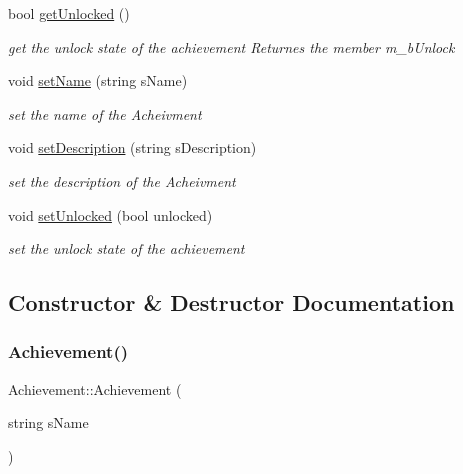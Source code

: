 \begin{DoxyCompactItemize}
\hypertarget{class_achievement_a1f0bb77d394b03c28b636688d7cbbf2b}{}\label{class_achievement_a1f0bb77d394b03c28b636688d7cbbf2b} 
bool \hyperlink{class_achievement_a1f0bb77d394b03c28b636688d7cbbf2b}{get\+Unlocked} ()
\begin{DoxyCompactList}\small\item\em get the unlock state of the achievement Returnes the member m\+\_\+b\+Unlock \end{DoxyCompactList}\item 
void \hyperlink{class_achievement_a9e0c9c6c154411d3529bca657c579beb}{set\+Name} (string s\+Name)
\begin{DoxyCompactList}\small\item\em set the name of the Acheivment \end{DoxyCompactList}\item 
void \hyperlink{class_achievement_a1e43852ad31739236d393f856e1f8f12}{set\+Description} (string s\+Description)
\begin{DoxyCompactList}\small\item\em set the description of the Acheivment \end{DoxyCompactList}\item 
void \hyperlink{class_achievement_a59aa51eab50fed4fb72eee2ff733e3ac}{set\+Unlocked} (bool unlocked)
\begin{DoxyCompactList}\small\item\em set the unlock state of the achievement \end{DoxyCompactList}\end{DoxyCompactItemize}


\subsection{Constructor \& Destructor Documentation}
\hypertarget{class_achievement_ad36246aeeae27b2e82a3a6d259cd483d}{}\label{class_achievement_ad36246aeeae27b2e82a3a6d259cd483d} 
\subsubsection{\texorpdfstring{Achievement()}{Achievement()}\hspace{0.1cm}{\footnotesize\ttfamily [1/3]}}
{\footnotesize\ttfamily Achievement\+::\+Achievement (\begin{DoxyParamCaption}\item[{string}]{s\+Name }\end{DoxyParamCaption})}



